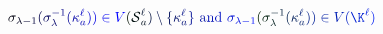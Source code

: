 \documentclass[12pt]{article}
\begin{document}
\makeatletter
\renewcommand*{\@textcolor}[3]{%
  \protect\leavevmode
  \begingroup
    \color#1{#2}#3%
  \endgroup
}
\makeatother
\begin{displaymath}
\mathcolor[RGB]{0,0,15}{\sigma} _ { \mathcolor[RGB]{0,0,30}{\lambda} \mathcolor[RGB]{0,0,45}{-} \mathcolor[RGB]{0,0,60}{1} } \mathcolor[RGB]{0,0,75}{(} \mathcolor[RGB]{0,0,90}{\sigma} _ { \mathcolor[RGB]{0,0,105}{\lambda} } ^ { \mathcolor[RGB]{0,0,120}{-} \mathcolor[RGB]{0,0,135}{1} } \mathcolor[RGB]{0,0,150}{(} \mathcolor[RGB]{0,0,165}{\kappa} _ { \mathcolor[RGB]{0,0,180}{a} } ^ { \mathcolor[RGB]{0,0,195}{\ell} } \mathcolor[RGB]{0,0,210}{)} \mathcolor[RGB]{0,0,225}{)} \mathcolor[RGB]{0,0,240}{\in} \mathcolor[RGB]{0,0,255}{V} \mathcolor[RGB]{0,15,0}{(} \mathcal { \mathcolor[RGB]{0,15,15}{S} } _ { \mathcolor[RGB]{0,15,30}{a} } ^ { \mathcolor[RGB]{0,15,45}{\ell} } \mathcolor[RGB]{0,15,60}{)} \mathcolor[RGB]{0,15,75}{\setminus} \mathcolor[RGB]{0,15,90}{\{} \mathcolor[RGB]{0,15,105}{\kappa} _ { \mathcolor[RGB]{0,15,120}{a} } ^ { \mathcolor[RGB]{0,15,135}{\ell} } \mathcolor[RGB]{0,15,150}{\}} \mathrm { ~ \mathcolor[RGB]{0,15,165}{a} \mathcolor[RGB]{0,15,180}{n} \mathcolor[RGB]{0,15,195}{d} ~ } \mathcolor[RGB]{0,15,210}{\sigma} _ { \mathcolor[RGB]{0,15,225}{\lambda} \mathcolor[RGB]{0,15,240}{-} \mathcolor[RGB]{0,15,255}{1} } \mathcolor[RGB]{0,30,0}{(} \mathcolor[RGB]{0,30,15}{\sigma} _ { \mathcolor[RGB]{0,30,30}{\lambda} } ^ { \mathcolor[RGB]{0,30,45}{-} \mathcolor[RGB]{0,30,60}{1} } \mathcolor[RGB]{0,30,75}{(} \mathcolor[RGB]{0,30,90}{\kappa} _ { \mathcolor[RGB]{0,30,105}{a} } ^ { \mathcolor[RGB]{0,30,120}{\ell} } \mathcolor[RGB]{0,30,135}{)} \mathcolor[RGB]{0,30,150}{)} \mathcolor[RGB]{0,30,165}{\in} \mathcolor[RGB]{0,30,180}{V} \mathcolor[RGB]{0,30,195}{(} \mathcolor[RGB]{0,30,210}{\K} ^ { \mathcolor[RGB]{0,30,225}{\ell} } \mathcolor[RGB]{0,30,240}{)}
\end{displaymath}
\end{document}
